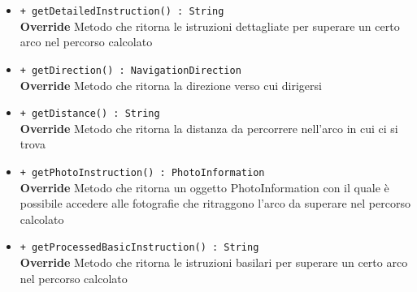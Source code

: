 \documentclass[../DefinizioneDiProdotto.tex]{subfiles}
\begin{document}
\begin{description}
\begin{itemize}
		\item \texttt{+ getDetailedInstruction() : String}\\
		\textbf{Override} Metodo che ritorna le istruzioni dettagliate per superare un certo arco nel percorso calcolato
		\item \texttt{+ getDirection() : NavigationDirection}\\
		\textbf{Override} Metodo che ritorna la direzione verso cui dirigersi
		\item \texttt{+ getDistance() : String}\\
		\textbf{Override} Metodo che ritorna la distanza da percorrere nell'arco in cui ci si trova
		\item \texttt{+ getPhotoInstruction() : PhotoInformation}\\
		\textbf{Override} Metodo che ritorna un oggetto PhotoInformation con il quale è possibile accedere alle fotografie che ritraggono l'arco da superare nel percorso calcolato
		\item \texttt{+ getProcessedBasicInstruction() : String}\\
		\textbf{Override} Metodo che ritorna le istruzioni basilari per superare un certo arco nel percorso calcolato
	\end{itemize}
\end{description}
\end{document}
